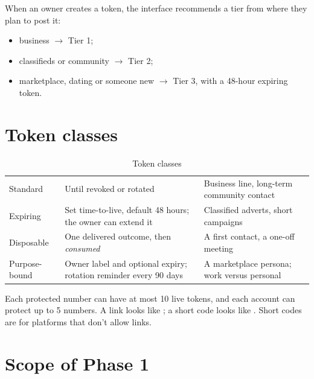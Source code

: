 When an owner creates a token, the interface recommends a tier from where they plan to post it:
\begin{itemize}
  \item business $\rightarrow$ Tier 1;
  \item classifieds or community $\rightarrow$ Tier 2;
  \item marketplace, dating or someone new $\rightarrow$ Tier 3, with a 48-hour expiring token.
\end{itemize}

\section{Token classes}

\begin{table}[H]
\centering\small
\caption{Token classes}\label{tab:classes}
\begin{tabularx}{\linewidth}{@{}L{2.4cm}L{4.6cm}Y@{}}
\toprule
{} &  &  \\
\midrule
Standard & Until revoked or rotated & Business line, long-term community contact \\
Expiring & Set time-to-live, default 48 hours; the owner can extend it & Classified adverts, short campaigns \\
Disposable & One delivered outcome, then \emph{consumed} & A first contact, a one-off meeting \\
Purpose-bound & Owner label and optional expiry; rotation reminder every 90 days & A marketplace persona; work versus personal \\
\bottomrule
\end{tabularx}
\end{table}

Each protected number can have at most 10 live tokens, and each account can protect up to 5 numbers. A link looks like ; a short code looks like . Short codes are for platforms that don't allow links.

\section{Scope of Phase 1}

